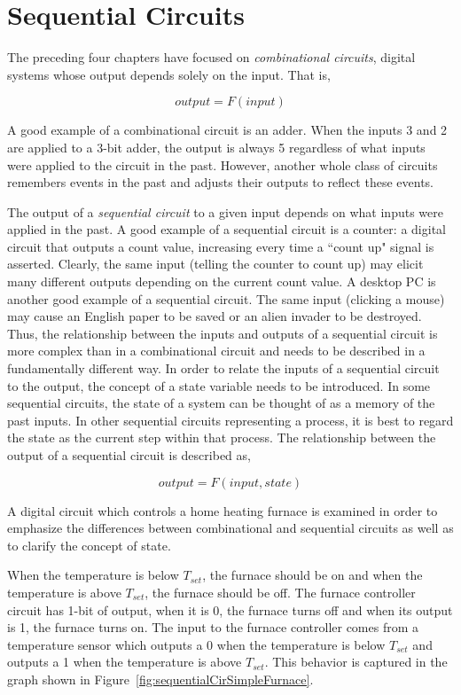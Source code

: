 \chapter{Sequential Circuits}
\label{chapter:Sequential Circuits}
\graphicspath{ {./chapter05/Fig} }

The preceding four chapters have focused on \textit{ combinational
circuits}, digital systems whose output depends solely on 
the input.  That is, 

$$output = F(input)$$

A good example of a combinational circuit is an adder.  When
the inputs 3 and 2 are applied to a 3-bit adder, the output 
is always 5 regardless of what inputs were applied to the 
circuit in the past. However, another whole class of 
circuits remembers events in the past and adjusts
their outputs to reflect these events.


The output of a \textit{ sequential circuit} to a given input
depends on what inputs were applied in the past.  A good 
example of a sequential circuit is a counter: a 
digital circuit that outputs a count value, increasing
every time a ``count up" signal is asserted.  Clearly, the 
same input (telling the counter to count up) may elicit 
many different outputs depending on the current count 
value.  A desktop PC is another good example of a 
sequential circuit.  The same input (clicking a mouse) may cause an
English paper to be saved or an alien invader to be destroyed.  Thus, the 
relationship between the inputs and outputs of a sequential circuit
is more complex than in a combinational circuit and needs 
to be described in a fundamentally different way. In order to relate 
the inputs of a sequential circuit to the output, the concept of a 
state variable needs to be introduced.  In some sequential circuits, the 
state of a system can be thought of as a memory of the past inputs.  
In other sequential circuits
representing a process, it is best to regard the state as the current 
step within that process.  The relationship between the output of 
a sequential circuit is described as,

$$output = F(input, state)$$

A digital circuit which  controls a home heating furnace is examined
in order  to emphasize the differences between combinational and 
sequential circuits as well as to clarify the concept of state.

When the temperature is below $T_{set}$, the furnace should be on 
and when the temperature is above $T_{set}$, the furnace should be 
off.  The furnace controller circuit has 1-bit of output, when 
it is 0, the furnace turns off and when its output is 1, the furnace turns on.  
The input to the furnace controller comes
from a temperature sensor which outputs a 0 when the temperature 
is below $T_{set}$ and outputs a 1 when the temperature 
is above $T_{set}$.  This behavior is captured in the graph shown 
in Figure~\ref{fig:sequentialCirSimpleFurnace}.

